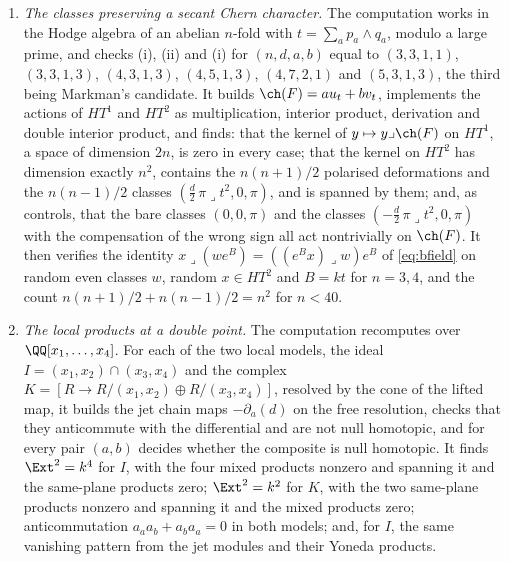 \begin{enumerate}[label=\textup{(\Roman*)},leftmargin=*]
  characteristics $14$, $-36$ and $24$ from the Koszul complexes; the count
  $12N(N-5)=(d+9)(3d-3)$ of isolated points and its comparison with the
  number $(d+9)(2d-1)$ of those that are normalised;
  $\chi(\cO_{\widetilde Z})=(d+9)(27-d)$ from the
  Mayer--Vietoris complex; the equality $\ch(\cF)=u_{t}+3v_{t}$ degree by
  degree for the twist $3\Theta$, and the failure by $-4\Theta^{2}$ in
  degree two for the twist $\Theta$; $\Nm(3+\sqrt{-d})=2N$ and the
  discriminant $(d+9)\Theta^{2}$; and the ranks $8d(d-9)$ and $8d(d+9)$ of
  the two transforms, with the threefold control $-8q$ that reproduces
  Markman's rank at $n=3$.
\item \emph{The classes preserving a secant Chern character.} The
  computation works in the Hodge algebra of an abelian $n$-fold with
  $t=\sum_{a}p_{a}\wedge q_{a}$, modulo a large prime,
  and checks (i), (ii) and (i) for
  $(n,d,a,b)$ equal to $(3,3,1,1)$, $(3,3,1,3)$, $(4,3,1,3)$, $(4,5,1,3)$,
  $(4,7,2,1)$ and $(5,3,1,3)$, the third being Markman's candidate. It builds
  $\ch(F)=au_{t}+bv_{t}$, implements the actions of $HT^{1}$ and $HT^{2}$ as
  multiplication, interior product, derivation and double interior product,
  and finds: that the kernel of $y\mapsto y\lrcorner\ch(F)$ on $HT^{1}$, a
  space of dimension $2n$, is zero in every case; that the kernel on $HT^{2}$ has
  dimension exactly $n^{2}$, contains the $n(n+1)/2$ polarised deformations
  and the $n(n-1)/2$ classes $(\tfrac d2\,\pi\lrcorner t^{2},0,\pi)$, and is
  spanned by them; and, as controls, that the bare classes $(0,0,\pi)$ and
  the classes $(-\tfrac d2\,\pi\lrcorner t^{2},0,\pi)$ with the compensation
  of the wrong sign all act nontrivially on $\ch(F)$. It then verifies the
  identity $x\lrcorner(we^{B})=((e^{B}x)\lrcorner w)e^{B}$ of
  \eqref{eq:bfield} on random even classes $w$, random $x\in HT^{2}$ and
  $B=kt$ for $n=3,4$, and the count $n(n+1)/2+n(n-1)/2=n^{2}$ for $n<40$.
\item \emph{The local products at a double point.} The computation recomputes
   over $\QQ[x_{1},\dots,x_{4}]$. For each of the
  two local models, the ideal $I=(x_{1},x_{2})\cap(x_{3},x_{4})$ and the
  complex $K=[R\to R/(x_{1},x_{2})\oplus R/(x_{3},x_{4})]$, resolved by the
  cone of the lifted map, it builds the jet chain maps $-\partial_{a}(d)$ on
  the free resolution, checks that they anticommute with the differential
  and are not null homotopic, and for every pair $(a,b)$ decides whether the
  composite is null homotopic. It finds $\Ext^{2}=k^{4}$ for $I$, with the
  four mixed products nonzero and spanning it and the same-plane products
  zero; $\Ext^{2}=k^{2}$ for $K$, with the two same-plane products nonzero
  and spanning it and the mixed products zero; anticommutation
  $a_{a}a_{b}+a_{b}a_{a}=0$ in both models; and, for $I$, the same vanishing
  pattern from the jet modules and their Yoneda products.


\end{enumerate}
